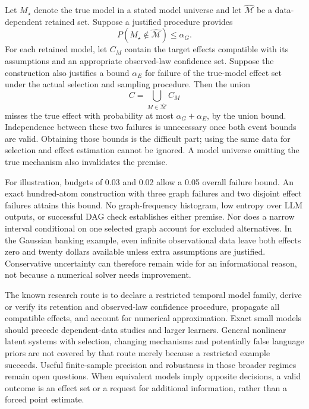 Let $M_\star$ denote the true model in a stated model universe and let
$\widehat{\mathcal M}$ be a data-dependent retained set. Suppose a justified
procedure provides
\[
 P(M_\star\notin\widehat{\mathcal M})\leq\alpha_G.
\]
For each retained model, let $C_M$ contain the target effects compatible with
its assumptions and an appropriate observed-law confidence set. Suppose
the construction also justifies a bound $\alpha_E$ for failure of the
true-model effect set under the actual selection and sampling procedure.
Then the union
\[
 C=\bigcup_{M\in\widehat{\mathcal M}}C_M
\]
misses the true effect with probability at most $\alpha_G+\alpha_E$, by the
union bound. Independence between these two failures is unnecessary once
both event bounds are valid. Obtaining those bounds is the difficult part;
using the same data for selection and effect estimation cannot be ignored.
A model universe omitting the true mechanism also invalidates the premise.
\citep{exec15_latent_exact,exec15_latent_design}

For illustration, budgets of 0.03 and 0.02 allow a 0.05 overall failure bound.
An exact hundred-atom construction with three graph failures and two disjoint
effect failures attains this bound. No graph-frequency histogram, low
entropy over LLM outputs, or successful DAG check establishes either
premise. Nor does a narrow interval conditional on one selected graph
account for excluded alternatives. In the Gaussian banking example, even
infinite observational data leave both effects zero and twenty dollars
available unless extra assumptions are justified. Conservative uncertainty
can therefore remain wide for an informational reason, not because a
numerical solver needs improvement.
\citep{exec15_latent_exact}

The known research route is to declare a restricted temporal model family,
derive or verify its retention and observed-law confidence procedure,
propagate all compatible effects, and account for numerical approximation.
Exact small models should precede dependent-data studies and larger
learners. General nonlinear latent systems with selection, changing
mechanisms and potentially false language priors are not covered by that
route merely because a restricted example succeeds. Useful finite-sample
precision and robustness in those broader regimes remain open questions.
When equivalent models imply opposite decisions, a valid outcome is an
effect set or a request for additional information, rather than a forced
point estimate.
\citep{exec15_latent_design}

